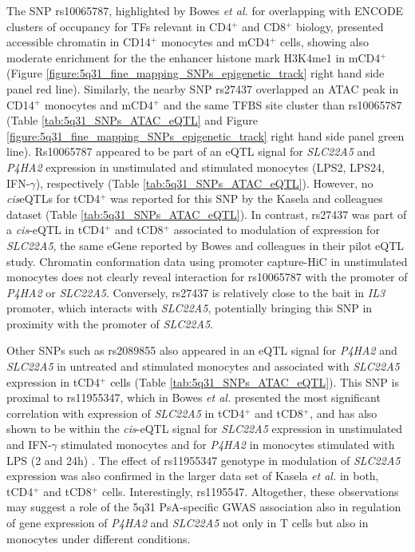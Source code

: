 The SNP rs10065787, highlighted by Bowes \textit{et al.} for overlapping with ENCODE clusters of occupancy for TFs relevant in CD4$^+$ and CD8$^+$ biology, presented accessible chromatin in CD14$^+$ monocytes and mCD4$^+$ cells, showing also moderate enrichment for the the enhancer histone mark H3K4me1 in mCD4$^+$ (Figure \ref{figure:5q31_fine_mapping_SNPs_epigenetic_track} right hand side panel red line). Similarly, the nearby SNP rs27437 overlapped an ATAC peak in CD14$^+$ monocytes and mCD4$^+$ and the same TFBS site cluster than rs10065787 (Table \ref{tab:5q31_SNPs_ATAC_eQTL} and Figure \ref{figure:5q31_fine_mapping_SNPs_epigenetic_track} right hand side panel green line). Rs10065787 appeared to be part of an eQTL signal for \textit{SLC22A5} and \textit{P4HA2} expression in unstimulated and stimulated monocytes (LPS2, LPS24, IFN-$\gamma$), respectively (Table \ref{tab:5q31_SNPs_ATAC_eQTL}). However, no \textit{cis}eQTLs for tCD4$^+$ was reported for this SNP by the Kasela and colleagues dataset (Table \ref{tab:5q31_SNPs_ATAC_eQTL}). In contrast, rs27437 was part of a \textit{cis}-eQTL in tCD4$^+$ and tCD8$^+$ associated to modulation of expression for \textit{SLC22A5}, the same eGene reported by Bowes and colleagues in their pilot eQTL study. Chromatin conformation data using promoter capture-HiC \parencite{Javierre2016} in unstimulated monocytes does not clearly reveal interaction for rs10065787 with the promoter of \textit{P4HA2} or \textit{SLC22A5}. Conversely, rs27437 is relatively close to the bait in \textit{IL3} promoter, which interacts with \textit{SLC22A5}, potentially bringing this SNP in proximity with the promoter of \textit{SLC22A5}.  


Other SNPs such as rs2089855 also appeared in an eQTL signal for \textit{P4HA2} and \textit{SLC22A5} in untreated and stimulated monocytes and associated with \textit{SLC22A5} expression in tCD4$^+$ cells (Table \ref{tab:5q31_SNPs_ATAC_eQTL}). This SNP is proximal to rs11955347, which in Bowes \textit{et al.} presented the most significant correlation with expression of \textit{SLC22A5} in tCD4$^+$ and tCD8$^+$, and has also shown to be within the \textit{cis}-eQTL signal for \textit{SLC22A5} expression in unstimulated and IFN-$\gamma$ stimulated monocytes and for \textit{P4HA2} in monocytes stimulated with LPS (2 and 24h) \parencite{Fairfax2014}. The effect of rs11955347 genotype in modulation of \textit{SLC22A5} expression was also confirmed in the larger data set of Kasela \textit{et al.} in both, tCD4$^+$ and tCD8$^+$ cells. Interestingly, rs1195547. Altogether, these observations may suggest a role of the 5q31 PsA-specific GWAS association also in regulation of gene expression of \textit{P4HA2} and \textit{SLC22A5} not only in T cells but also in monocytes under different conditions. 


